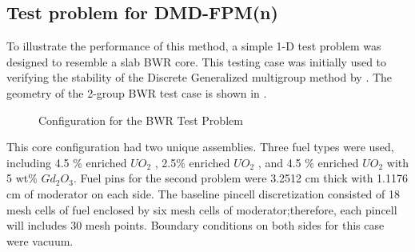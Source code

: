 \subsection{Test problem for DMD-FPM(n)}

To illustrate the performance of this method, a simple 1-D test problem was designed to resemble a slab BWR core.
This testing case was initially used to verifying the stability of the Discrete Generalized multigroup method by \citet{rahnema_generalized_2008}. 
The geometry of the 2-group BWR test case is shown in .
\begin{figure}[htb!]
    \centering
    \begin{minipage}[c]{\textwidth}
        \centering
        
    \end{minipage}
    \begin{minipage}[c]{\textwidth}
        \centering
        
    \end{minipage}
    \begin{minipage}[c]{\textwidth}
        \centering
        
    \end{minipage}
    \caption{Configuration for the BWR Test Problem\cite{rahnema_generalized_2008}}
    \label{fig:BWRconfig}
\end{figure}

This core configuration had two unique assemblies.  
Three fuel types were used, including  4.5 \% enriched $UO_2$ , 2.5\% enriched $UO_2$ , and 4.5 \% enriched $UO_2$ with 5 wt\% $Gd_2O_3$.
Fuel pins for the second problem were 3.2512 cm thick with 1.1176 cm of moderator on each side.
The baseline pincell discretization consisted of 18 mesh cells of fuel enclosed by six mesh cells of moderator;therefore, each pincell will includes 30 mesh points.
Boundary conditions on both sides for this case were vacuum.

